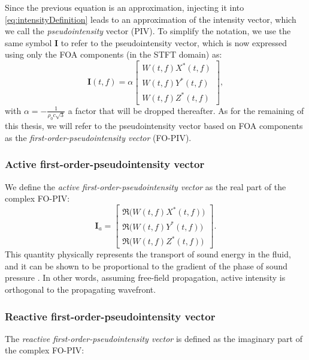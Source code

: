 Since the previous equation is an approximation, injecting it into \eqref{eq:intensityDefinition} leads to an approximation of the intensity vector, which we call the \textit{pseudointensity} vector (PIV). To simplify the notation, we use the same symbol $\mathbf{I}$ to refer to the pseudointensity vector, which is now expressed using only the FOA components (in the STFT domain) as:
\begin{equation}
    \mathbf{I}(t,f) = \alpha \begin{bmatrix} W(t,f) X^*(t,f) \\ W(t,f) Y^*(t,f) \\ W(t,f) Z^*(t,f) \end{bmatrix},
\end{equation}
with $\alpha = - \frac{1}{\rho_0 c \sqrt{3}}$ a factor that will be dropped thereafter. As for the remaining of this thesis, we will refer to the pseudointensity vector based on FOA components as the \textit{first-order-pseudointensity vector} (FO-PIV).

\subsubsection{Active first-order-pseudointensity vector}

We define the \textit{active first-order-pseudointensity vector} as the real part of the complex FO-PIV:
\begin{equation}
    \label{eq:activeFOPIV}
    \mathbf{I}_a = \begin{bmatrix} \mathfrak{R}\big(W(t,f) X^*(t,f)\big) \\ \mathfrak{R}\big(W(t,f) Y^*(t,f)\big) \\ \mathfrak{R}\big(W(t,f) Z^*(t,f)\big) \end{bmatrix}.
\end{equation}
This quantity physically represents the transport of sound energy in the fluid, and it can be shown to be proportional to the gradient of the phase of sound pressure \cite{jacobsen_fundamentals_2013}. In other words, assuming free-field propagation, active intensity is orthogonal to the propagating wavefront.

\subsubsection{Reactive first-order-pseudointensity vector}

The \textit{reactive first-order-pseudointensity vector} is defined as the imaginary part of the complex FO-PIV:

